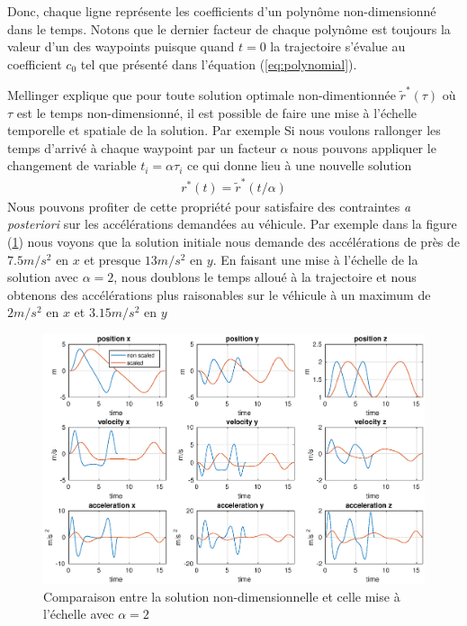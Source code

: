 Donc, chaque ligne représente les coefficients d'un polynôme non-dimensionné dans le temps. Notons que le dernier facteur de chaque polynôme est toujours la valeur d'un des waypoints puisque quand $t=0$ la trajectoire s'évalue au coefficient $c_0$ tel que présenté dans l'équation (\ref{eq:polynomial}). 

Mellinger explique que pour toute solution optimale non-dimentionnée $\tilde{r}^*(\tau)$ où $\tau$ est le temps non-dimensionné, il est possible de faire une mise à l'échelle temporelle et spatiale de la solution. Par exemple Si nous voulons rallonger les temps d'arrivé à chaque waypoint par un facteur $\alpha$ nous pouvons appliquer le changement de variable $t_i = \alpha \tau_i$ ce qui donne lieu à une nouvelle solution
\begin{align*}
	r^*(t) = \tilde{r}^*(t/\alpha)
\end{align*}
Nous pouvons profiter de cette propriété pour satisfaire des contraintes \textit{a posteriori} sur les accélérations demandées au véhicule. Par exemple dans la figure (\ref{fig:comparaison_nondimensionalisation}) nous voyons que la solution initiale nous demande des accélérations de près de $7.5 m/s^2$ en $x$ et presque $13 m/s^2$ en $y$. En faisant une mise à l'échelle de la solution avec $\alpha = 2$, nous doublons le temps alloué à la trajectoire et nous obtenons des accélérations plus raisonables sur le véhicule à un maximum de $2 m/s^2$ en $x$ et $3.15 m/s^2$ en $y$

\begin{figure}[h]
  \centering
  \includegraphics[width=\textwidth ,trim=50 25 65 15, clip]{fig/figure8_derivatives}
  \caption{Comparaison entre la solution non-dimensionnelle et celle mise à l'échelle avec $\alpha = 2$}
  \label{fig:comparaison_nondimensionalisation}
\end{figure}

